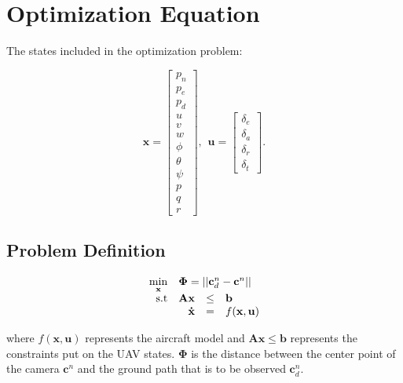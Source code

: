 \section*{Optimization Equation}

The states included in the optimization problem:
	
\begin{equation}
	\mathbf{x} = 
	\begin{bmatrix}
		p_n 	\\ p_e		\\ p_d		\\
		u 		\\ v   		\\ w   		\\ 
		\phi	\\ \theta	\\	\psi	\\
		p		\\ q		\\ r
	\end{bmatrix}, \hspace{5pt}
	\mathbf{u} = 
	\begin{bmatrix}
		\delta_e\\ \delta_a	\\ \delta_r	\\ \delta_t
	\end{bmatrix}.
\end{equation}


\subsection*{Problem Definition}

\begin{equation}
	\begin{array}{rrclcl}
		\displaystyle \min_{\mathbf{x}} & \multicolumn{3}{l}{\bm{\Phi} = ||\mathbf{c}^n_d - \mathbf{c}^n||} \\
		\textrm{s.t}
		& \mathbf{A} \mathbf{x} & \leq & \mathbf{b} \\
		& \displaystyle \mathbf{\dot{x}} & = & f(\mathbf{x},\mathbf{u}) \\
	\end{array}
\end{equation}

where $f(\mathbf{x},\mathbf{u})$ represents the aircraft model and $\mathbf{A} \mathbf{x} \leq \mathbf{b}$ represents the constraints put on the UAV states. $\bm{\Phi}$ is the distance between the center point of the camera $\mathbf{c}^n$ and the ground path that is to be observed $\mathbf{c}^n_d$.


